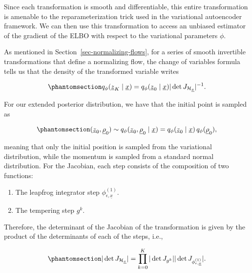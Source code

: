 \documentclass[
]{scrartcl}
\providecommand{\tightlist}{%
  \setlength{\itemsep}{0pt}\setlength{\parskip}{0pt}}\usepackage{longtable,booktabs,array}
\begin{document}
\begin{refsection}
Since each transformation is smooth and differentiable, this entire
transformation is amenable to the reparameterization trick used in the
variational autoencoder framework. We can then use this transformation
to access an unbiased estimator of the gradient of the ELBO with respect
to the variational parameters \(\phi\).

As mentioned in Section~\ref{sec-normalizing-flows}, for a series of
smooth invertible transformations that define a normalizing flow, the
change of variables formula tells us that the density of the transformed
variable writes

\begin{equation}\phantomsection\label{eq-flow-density-hvae}{
q_\phi(\underline{z}_K \mid \underline{x}) = 
q_\phi(\underline{z}_0 \mid \underline{x}) 
|\det J_{\mathcal{H}_{\underline{x}}}|^{-1}.
}\end{equation}

For our extended posterior distribution, we have that the initial point
is sampled as

\begin{equation}\phantomsection\label{eq-extended-posterior-init}{
(\underline{z}_0, \underline{\rho}_0) \sim 
q_\phi(\underline{z}_0, \underline{\rho}_0 \mid \underline{x}) =
q_\phi(\underline{z}_0 \mid \underline{x}) \, q_\phi(\underline{\rho}_0),
}\end{equation}

meaning that only the initial position is sampled from the variational
distribution, while the momentum is sampled from a standard normal
distribution. For the Jacobian, each step consists of the composition of
two functions:

\begin{enumerate}
\def\labelenumi{\arabic{enumi}.}
\tightlist
\item
  The leapfrog integrator step \(\phi_{\epsilon,\underline{x}}^{(1)}\).
\item
  The tempering step \(g^k\).
\end{enumerate}

Therefore, the determinant of the Jacobian of the transformation is
given by the product of the determinants of each of the steps, i.e.,

\begin{equation}\phantomsection\label{eq-hvae-jacobian}{
|\det J_{\mathcal{H}_{\underline{x}}}| = 
\prod_{k=0}^K |\det J_{g^k}| 
|\det J_{\phi_{\epsilon,\underline{x}}^{(1)}}|.
}\end{equation}


\end{refsection}
\end{document}
